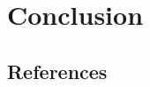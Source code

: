 \chapter{Conclusion}
\label{sec:conclusion}

\lipsum[1-2]

\section{References}
\printbibliography[heading=none]

